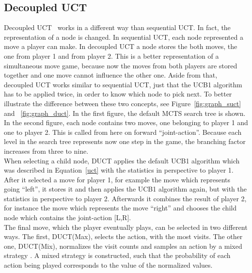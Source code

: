 \documentclass{article}
\begin{document}
\subsection{Decoupled UCT}
\label{subsec:duct}
Decoupled UCT~\cite{finnson_master} works in a different way than sequential UCT. In fact, the representation of a node is changed. In sequential UCT, each node represented a move a player can make. In decoupled UCT a node stores the both moves, the one from player 1 and from player 2. This is a better representation of a simultaneous move game, because now the moves from both players are stored together and one move cannot influence the other one. Aside from that, decoupled UCT works similar to sequential UCT, just that the UCB1 algorithm has to be applied twice, in order to know which node to pick next. To better illustrate the difference between these two concepts, see Figure~\ref{fig:graph_suct} and ~\ref{fig:graph_duct}. In the first figure, the default MCTS search tree is shown. In the second figure, each node contains two moves, one belonging to player 1 and one to player 2. This is called from here on forward ``joint-action''. Because each level in the search tree represents now one step in the game, the branching factor increases from three to nine.\\
When selecting a child node, DUCT applies the default UCB1 algorithm which was described in Equation~\ref{uct} with the statistics in perspective to player 1. After it selected a move for player 1, for example the move which represents going ``left'', it stores it and then applies the UCB1 algorithm again, but with the statistics in perspective to player 2. Afterwards it combines the result of player 2, for instance the move which represents the move ``right'' and chooses the child node which contains the joint-action [L,R].\\
The final move, which the player eventually plays, can be selected in two different ways. The first, DUCT(Max), selects the action, with the most visits. The other one, DUCT(Mix), normalizes the visit counts and samples an action by a mixed strategy \cite{mcts_goofspiel}. A mixed strategy is constructed, such that the probability of each action being played corresponds to the value of the normalized values.
\end{document}
